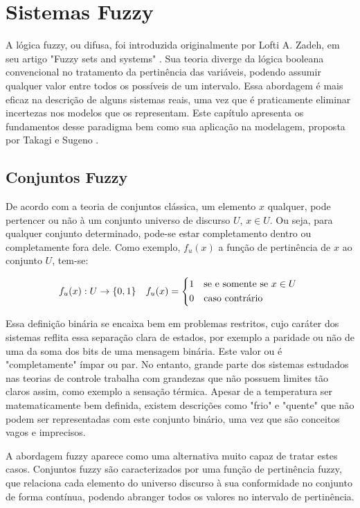 %

\chapter{Sistemas Fuzzy} \label{capFundFuzzy}
A lógica fuzzy, ou difusa, foi introduzida originalmente por Lofti A. Zadeh, em seu artigo "Fuzzy sets and systems" \cite{zadeh}. Sua teoria diverge da lógica booleana convencional no tratamento da pertinência das variáveis, podendo assumir qualquer valor entre todos os possíveis de um intervalo. Essa abordagem é mais eficaz na descrição de alguns sistemas reais, uma vez que é praticamente eliminar incertezas nos modelos que os representam. Este capítulo apresenta os fundamentos desse paradigma bem como sua aplicação na modelagem, proposta por Takagi e Sugeno \cite{takagiSugeno}.

\section{Conjuntos Fuzzy}
De acordo com a teoria de conjuntos clássica, um elemento $x$ qualquer, pode pertencer ou não à um conjunto universo de discurso $U$, $x \in U$. Ou seja, para qualquer conjunto determinado, pode-se estar completamento dentro ou completamente fora dele. Como exemplo, $f_u(x)$ a função de pertinência de $x$ ao conjunto $U$, tem-se:

\begin{align}
	f_u(x) : U \rightarrow \{0,1\}
	&& f_u(x) =
	\begin{cases*}
		1 & se e somente se $x \in U$ \\
		0 & caso contrário
	\end{cases*}
	\label{eqFPertinencia}
\end{align}

Essa definição binária se encaixa bem em problemas restritos, cujo caráter dos sistemas reflita essa separação clara de estados, por exemplo a paridade ou não de uma da soma dos bits de uma mensagem binária. Este valor ou é "completamente" ímpar ou par. No entanto, grande parte dos sistemas estudados nas teorias de controle trabalha com grandezas que não possuem limites tão claros assim, como exemplo a sensação térmica. Apesar de a temperatura ser matematicamente bem definida, existem descrições como "frio" e "quente" que não podem ser representadas com este conjunto binário, uma vez que são conceitos vagos e imprecisos.

A abordagem fuzzy aparece como uma alternativa muito capaz de tratar estes casos. Conjuntos fuzzy são caracterizados por uma função de pertinência fuzzy, que relaciona cada elemento do universo discurso à sua conformidade no conjunto de forma contínua, podendo abranger todos os valores no intervalo de pertinência.

